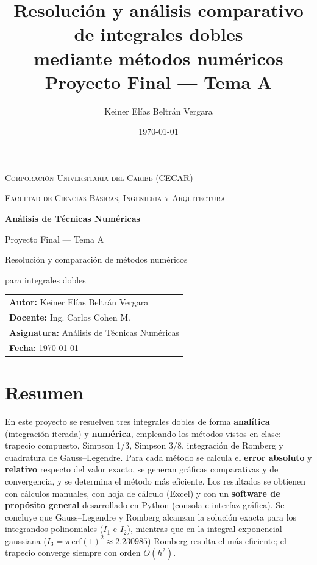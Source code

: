 \documentclass[12pt,a4paper]{article}
\title{\textbf{Resolución y análisis comparativo de integrales dobles}\\[4pt]
       \large mediante métodos numéricos\\[6pt]
       \normalsize Proyecto Final — Tema A}
\author{Keiner Elías Beltrán Vergara}
\date{\today}
\begin{document}
\begin{titlepage}
  \centering
  {\scshape\large Corporación Universitaria del Caribe (CECAR)\par}
  {\scshape Facultad de Ciencias Básicas, Ingeniería y Arquitectura\par}
  \vfill
  {\Huge\bfseries Análisis de Técnicas Numéricas\par}
  \vspace{1cm}
  {\LARGE Proyecto Final — Tema A\par}
  \vspace{0.6cm}
  {\large Resolución y comparación de métodos numéricos\par
         para integrales dobles\par}
  \vfill
  \begin{tabular}[t]{l}
    \textbf{Autor:} Keiner Elías Beltrán Vergara\\[4pt]
    \textbf{Docente:} Ing. Carlos Cohen M.\\[4pt]
    \textbf{Asignatura:} Análisis de Técnicas Numéricas\\[4pt]
    \textbf{Fecha:} \today
  \end{tabular}
  \vfill
\end{titlepage}

\tableofcontents
\newpage

\section*{Resumen}
En este proyecto se resuelven tres integrales dobles de forma
\textbf{analítica} (integración iterada) y \textbf{numérica}, empleando los
métodos vistos en clase: trapecio compuesto, Simpson 1/3, Simpson 3/8,
integración de Romberg y cuadratura de Gauss--Legendre. Para cada método se
calcula el \textbf{error absoluto} y \textbf{relativo} respecto del valor
exacto, se generan gráficas comparativas y de convergencia, y se determina el
método más eficiente. Los resultados se obtienen con cálculos manuales, con
hoja de cálculo (Excel) y con un \textbf{software de propósito general}
desarrollado en Python (consola e interfaz gráfica). Se concluye que
Gauss--Legendre y Romberg alcanzan la solución exacta para los integrandos
polinomiales ($I_1$ e $I_2$), mientras que en la integral exponencial gaussiana
($I_3=\pi\,\mathrm{erf}(1)^2\approx 2.230985$) Romberg resulta el más
eficiente; el trapecio converge siempre con orden $O(h^2)$.
\end{document}
